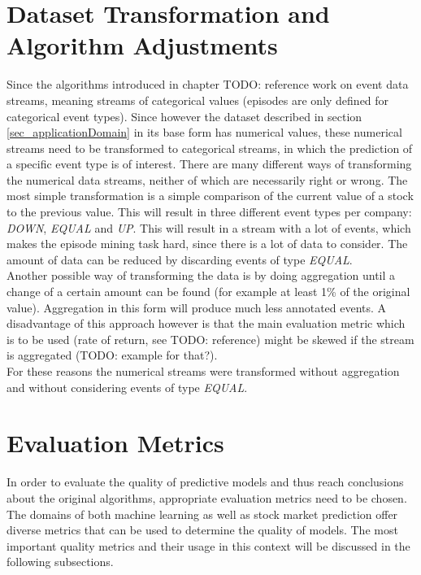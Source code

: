 \section{Dataset Transformation and Algorithm Adjustments}
\label{sec_transformation}
Since the algorithms introduced in chapter TODO: reference work on event data streams, meaning streams of categorical values (episodes are only defined for categorical event types). Since however the dataset described in section \ref{sec_applicationDomain} in its base form has numerical values, these numerical streams need to be transformed to categorical streams, in which the prediction of a specific event type is of interest. There are many different ways of transforming the numerical data streams, neither of which are necessarily right or wrong. The most simple transformation is a simple comparison of the current value of a stock to the previous value. This will result in three different event types per company: \textit{DOWN}, \textit{EQUAL} and \textit{UP}. This will result in a stream with a lot of events, which makes the episode mining task hard, since there is a lot of data to consider. The amount of data can be reduced by discarding events of type \textit{EQUAL}. \\
Another possible way of transforming the data is by doing aggregation until a change of a certain amount can be found (for example at least 1\% of the original value). Aggregation in this form will produce much less annotated events. A disadvantage of this approach however is that the main evaluation metric which is to be used (rate of return, see TODO: reference) might be skewed if the stream is aggregated (TODO: example for that?).\\
For these reasons the numerical streams were transformed without aggregation and without considering events of type \textit{EQUAL}.

\section{Evaluation Metrics}
\label{sec_evaluationMetrics}

In order to evaluate the quality of predictive models and thus reach conclusions about the original algorithms, appropriate evaluation metrics need to be chosen. The domains of both machine learning as well as stock market prediction offer diverse metrics that can be used to determine the quality of models. The most important quality metrics and their usage in this context will be discussed in the following subsections.

